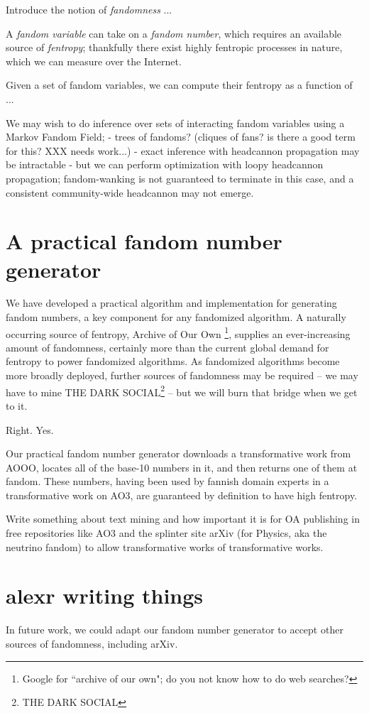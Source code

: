 \documentclass[11pt,twocolumn]{article}
\begin{document}
Introduce the notion of \emph{fandomness} ...

A \emph{fandom variable} can take on a \emph{fandom number}, which requires an
available source of \emph{fentropy}; thankfully there exist highly fentropic
processes in nature, which we can measure over the Internet.

Given a set of fandom variables, we can compute their fentropy as a function of
...

We may wish to do inference over sets of interacting fandom variables using a
Markov Fandom Field; 
- trees of fandoms? (cliques of fans? is there a good term for this? XXX needs
  work...)
- exact inference with headcannon propagation may be intractable
- but we can perform optimization with loopy headcannon propagation;
  fandom-wanking is not guaranteed to terminate in this case, and a consistent
  community-wide headcannon may not emerge.

\section{A practical fandom number generator}
We have developed a practical algorithm and implementation for generating
fandom numbers, a key component for any fandomized algorithm. A naturally
occurring source of fentropy, Archive of Our Own \footnote{Google for ``archive
of our own"; do you not know how to do web searches?}, supplies an
ever-increasing amount of fandomness, certainly more than the current global
demand for fentropy to power fandomized algorithms. As fandomized algorithms
become more broadly deployed, further sources of fandomness may be required --
we may have to mine THE DARK SOCIAL\footnote{THE DARK SOCIAL} -- but we will
burn that bridge when we get to it.

Right. Yes.

Our practical fandom number generator downloads a transformative work from
AOOO, locates all of the base-10 numbers in it, and then returns one of them at
fandom. These numbers, having been used by fannish domain experts in a
transformative work on AO3, are guaranteed by definition to have high fentropy.

Write something about text mining and how important it is for OA publishing in
free repositories like AO3 and the splinter site arXiv (for Physics, aka the
neutrino fandom) to allow transformative works of transformative works.  

\section{alexr writing things}
In future work, we could adapt our fandom number generator to accept other
sources of fandomness, including arXiv.


{}
\end{document}
